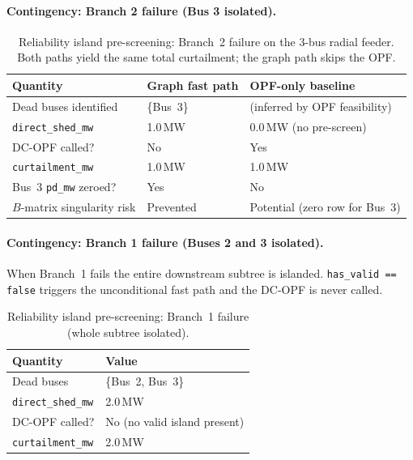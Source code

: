 \paragraph{Contingency: Branch 2 failure (Bus 3 isolated).}

\begin{table}[ht]
\centering
\caption{%
  Reliability island pre-screening: Branch~2 failure on the 3-bus radial feeder.
  Both paths yield the same total curtailment; the graph path skips the OPF.}
\label{tab:reliability_island}
\small
\begin{tabular}{lll}
\hline
\textbf{Quantity} & \textbf{Graph fast path} & \textbf{OPF-only baseline} \\
\hline
Dead buses identified          & \{Bus~3\}      & (inferred by OPF feasibility) \\
\texttt{direct\_shed\_mw}      & 1.0\,MW        & 0.0\,MW (no pre-screen) \\
DC-OPF called?                 & No             & Yes \\
\texttt{curtailment\_mw}       & 1.0\,MW        & 1.0\,MW \\
Bus~3 \texttt{pd\_mw} zeroed?  & Yes            & No \\
$B$-matrix singularity risk    & Prevented      & Potential (zero row for Bus~3) \\
\hline
\end{tabular}
\end{table}

\paragraph{Contingency: Branch 1 failure (Buses 2 and 3 isolated).}

When Branch~1 fails the entire downstream subtree is islanded.
\texttt{has\_valid == false} triggers the unconditional fast path and the
DC-OPF is never called.

\begin{table}[ht]
\centering
\caption{Reliability island pre-screening: Branch~1 failure (whole subtree isolated).}
\label{tab:reliability_island_br1}
\small
\begin{tabular}{ll}
\hline
\textbf{Quantity} & \textbf{Value} \\
\hline
Dead buses                      & \{Bus~2, Bus~3\} \\
\texttt{direct\_shed\_mw}       & 2.0\,MW \\
DC-OPF called?                  & No (no valid island present) \\
\texttt{curtailment\_mw}        & 2.0\,MW \\
\hline
\end{tabular}
\end{table}

